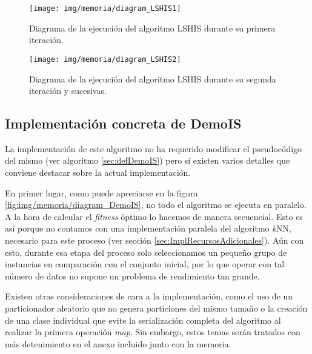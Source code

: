 	\begin{figure}[!h]
		\centering
		\texttt{[image: img/memoria/diagram\_LSHIS1]}
		\caption{Diagrama de la ejecución del algoritmo LSHIS durante su primera iteración.}\label{fig:img/memoria/diagram_LSHIS1}
	\end{figure}
	\FloatBarrier
	
		\begin{figure}[!h]
		\centering
		\texttt{[image: img/memoria/diagram\_LSHIS2]}
		\caption{Diagrama de la ejecución del algoritmo LSHIS durante su segunda iteración y sucesivas.}\label{fig:img/memoria/diagram_LSHIS2}
	\end{figure}
	\FloatBarrier



\subsection{Implementación concreta de DemoIS}

La implementación de este algoritmo no ha requerido modificar el pseudocódigo del mismo (ver algoritmo \ref{sec:defDemoIS}) pero sí existen varios detalles que conviene destacar sobre la actual implementación.

En primer lugar, como puede apreciarse en la figura \ref{fig:img/memoria/diagram_DemoIS}, no todo el algoritmo se ejecuta en paralelo. A la hora de calcular el \textit{fitness} óptimo lo hacemos de manera secuencial. Esto es así porque no contamos con una implementación paralela del algoritmo \textit{k}NN, necesario para este proceso (ver sección \ref{sec:ImplRecursosAdicionales}). Aún con esto, durante esa etapa del proceso solo seleccionamos un pequeño grupo de instancias en comparación con el conjunto inicial, por lo que operar con tal número de datos no supone un problema de rendimiento tan grande.

Existen otras consideraciones de cara a la implementación, como el uso de un particionador aleatorio que no genera particiones del mismo tamaño o la creación de una clase individual que evite la serialización completa del algoritmo al realizar la primera operación \textit{map}. Sin embargo, estos temas serán tratados con más detenimiento en el anexo incluido junto con la memoria.

